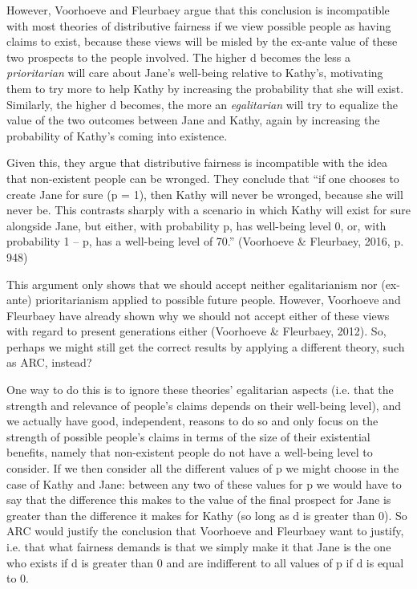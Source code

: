 \documentclass[man,11pt,a4paper]{apa7}
\begin{document}
However, Voorhoeve and Fleurbaey argue that this conclusion is incompatible with most theories of distributive fairness if we view possible people as having claims to exist, because these views will be misled by the ex-ante value of these two prospects to the people involved. The higher d becomes the less a \textit{prioritarian} will care about Jane's well-being relative to Kathy's, motivating them to try more to help Kathy by increasing the probability that she will exist. Similarly, the higher d becomes, the more an \textit{egalitarian} will try to equalize the value of the two outcomes between Jane and Kathy, again by increasing the probability of Kathy's coming into existence.

Given this, they argue that distributive fairness is incompatible with the idea that non-existent people can be wronged. They conclude that ``if one chooses to create Jane for sure (p = 1), then Kathy will never be wronged, because she will never be. This contrasts sharply with a scenario in which Kathy will exist for sure alongside Jane, but either, with probability p, has well-being level 0, or, with probability 1 -- p, has a well-being level of 70.'' (Voorhoeve \& Fleurbaey, 2016, p. 948)

This argument only shows that we should accept neither egalitarianism nor (ex-ante) prioritarianism applied to possible future people. However, Voorhoeve and Fleurbaey have already shown why we should not accept either of these views with regard to present generations either (Voorhoeve \& Fleurbaey, 2012). So, perhaps we might still get the correct results by applying a different theory, such as ARC, instead?

One way to do this is to ignore these theories' egalitarian aspects (i.e. that the strength and relevance of people's claims depends on their well-being level), and we actually have good, independent, reasons to do so and only focus on the strength of possible people's claims in terms of the size of their existential benefits, namely that non-existent people do not have a well-being level to consider. If we then consider all the different values of p we might choose in the case of Kathy and Jane: between any two of these values for p we would have to say that the difference this makes to the value of the final prospect for Jane is greater than the difference it makes for Kathy (so long as d is greater than 0). So ARC would justify the conclusion that Voorhoeve and Fleurbaey want to justify, i.e. that what fairness demands is that we simply make it that Jane is the one who exists if d is greater than 0 and are indifferent to all values of p if d is equal to 0.
\end{document}
